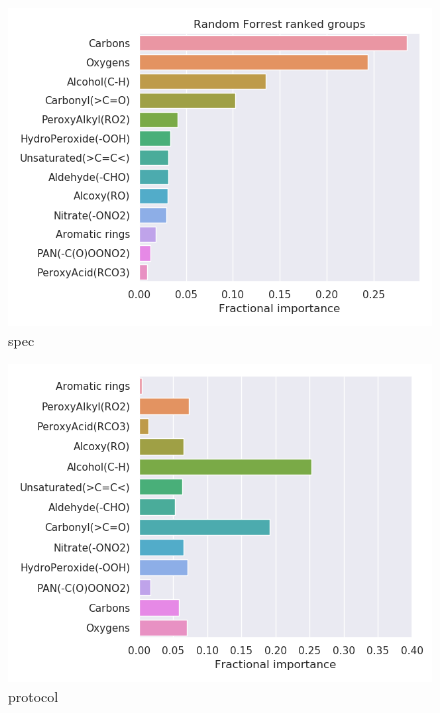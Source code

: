 \begin{subfigure}[b]{0.4\textwidth}
    \centering
    \includegraphics[width=\textwidth]{outputs/PCA/spec/legend.png}
    \caption{spec}
    \label{fig:legend_PCA_spec}
\end{subfigure}
\begin{subfigure}[b]{0.4\textwidth}
    \centering
    \includegraphics[width=\textwidth]{outputs/PCA/protocol/legend.png}
    \caption{protocol}
    \label{fig:legend_PCA_protocol}
\end{subfigure}
